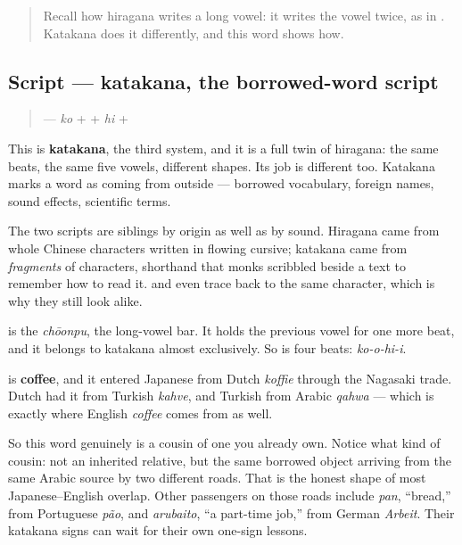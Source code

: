 \begin{quote}
Recall how hiragana writes a long vowel: it writes the vowel twice, as in \textbf{}. Katakana does it differently, and this word shows how.
\end{quote}

\subsection*{Script — katakana, the borrowed-word script}
\begin{quote}
\textbf{} — \textbf{} \emph{ko} + \textbf{} + \textbf{} \emph{hi} + \textbf{}
\end{quote}

This is \textbf{katakana}, the third system, and it is a full twin of hiragana: the same beats, the same five vowels, different shapes. Its job is different too. Katakana marks a word as coming from outside — borrowed vocabulary, foreign names, sound effects, scientific terms.

The two scripts are siblings by origin as well as by sound. Hiragana came from whole Chinese characters written in flowing cursive; katakana came from \emph{fragments} of characters, shorthand that monks scribbled beside a text to remember how to read it. \textbf{} and \textbf{} even trace back to the same character, which is why they still look alike.

\textbf{} is the \emph{chōonpu}, the long-vowel bar. It holds the previous vowel for one more beat, and it belongs to katakana almost exclusively. So \textbf{} is four beats: \emph{ko-o-hi-i}.

\begin{cousinweb}
\textbf{} is \textbf{coffee}, and it entered Japanese from Dutch \emph{koffie} through the Nagasaki trade. Dutch had it from Turkish \emph{kahve}, and Turkish from Arabic \emph{qahwa} — which is exactly where English \emph{coffee} comes from as well.

So this word genuinely is a cousin of one you already own. Notice what kind of cousin: not an inherited relative, but the same borrowed object arriving from the same Arabic source by two different roads. That is the honest shape of most Japanese–English overlap. Other passengers on those roads include \emph{pan}, \textquotedblleft{}bread,\textquotedblright{} from Portuguese \emph{pão}, and \emph{arubaito}, \textquotedblleft{}a part-time job,\textquotedblright{} from German \emph{Arbeit}. Their katakana signs can wait for their own one-sign lessons.
\end{cousinweb}


